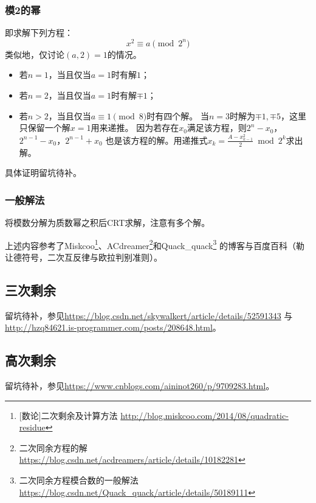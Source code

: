 \subsubsection{模2的幂}
即求解下列方程：
\begin{displaymath}
	x^2\equiv a \pmod{2^n}
\end{displaymath}
类似地，仅讨论$(a,2)=1$的情况。

\begin{itemize}
    \item 若$n=1$，当且仅当$a=1$时有解$1$；
    \item 若$n=2$，当且仅当$a=1$时有解$\mp 1$；
    \item 若$n>2$，当且仅当$a\equiv 1\pmod{8}$时有四个解。
    当$n=3$时解为$\mp 1,\mp 5$，这里只保留一个解$x=1$用来递推。
    因为若存在$x_0$满足该方程，则$2^n-x_0$，$2^{n-1}-x_0$，$2^{n-1}+x_0$
    也是该方程的解。用递推式$x_k=\frac{A -x_{k-1}^2}{2} \bmod 2^k$求出解。
\end{itemize}
具体证明留坑待补。

\subsubsection{一般解法}
将模数分解为质数幂之积后CRT求解，注意有多个解。

上述内容参考了Miskcoo\footnote{
	[数论]二次剩余及计算方法
	\url{http://blog.miskcoo.com/2014/08/quadratic-residue}
}、ACdreamer\footnote{
    二次同余方程的解
    \url{https://blog.csdn.net/acdreamers/article/details/10182281}
}和Quack\_quack\footnote{
    二次同余方程模合数的一般解法
    \url{https://blog.csdn.net/Quack\_quack/article/details/50189111}
}
的博客与百度百科（勒让德符号，二次互反律与欧拉判别准则）。
\subsection{三次剩余}
留坑待补，参见\url{https://blog.csdn.net/skywalkert/article/details/52591343}
与\url{http://hzq84621.is-programmer.com/posts/208648.html}。
\subsection{高次剩余}
留坑待补，参见\url{https://www.cnblogs.com/aininot260/p/9709283.html}。
